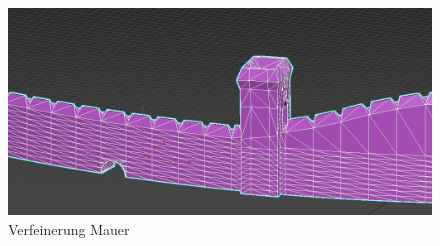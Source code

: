 \begin{figure}[h]
	\centering
	\includegraphics[width=0.95 \linewidth]{Abbildungen/3dsMax/Mauer}
	\caption{Verfeinerung Mauer}
	\label{fig:Mauer}
\end{figure}

